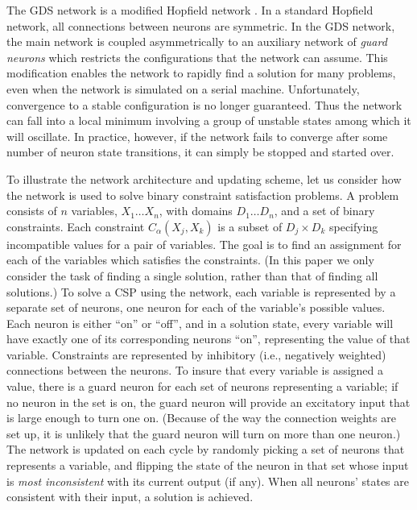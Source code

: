 The GDS network is a modified Hopfield network \cite{hopfield}. 
In a standard Hopfield network, all connections between neurons are
symmetric. In the GDS network, the main network is coupled
asymmetrically to an auxiliary network of {\em guard neurons} which
restricts the configurations that the network can assume.  This
modification enables the network to rapidly find a solution for many
problems, even when the network is simulated on a serial machine.  
Unfortunately, convergence to a stable configuration is no
longer guaranteed.  Thus the network can fall into a local minimum
involving a group of unstable states among which it will oscillate.
In practice, however, if the network fails to converge after some
number of neuron state transitions, it can simply be stopped and
started over.

To illustrate the network architecture and updating scheme, let us
consider how the network is used to solve binary constraint
satisfaction problems.  A problem consists of $n$ variables,
$X_{1}\ldots X_{n}$, with domains $D_{1}\ldots D_{n}$, and a set of
binary constraints. Each constraint $C_{\alpha}(X_{j},X_{k})$ is a
subset of $D_{j} \times D_{k}$ specifying incompatible values for a
pair of variables. The goal is to find an assignment for each of the
variables which satisfies the constraints. (In this paper we only
consider the task of finding a single solution, rather than that of
finding all solutions.)  To solve a CSP using the network, each
variable is represented by a separate set of neurons, one neuron for
each of the variable's possible values.  Each neuron is either ``on''
or ``off'', and in a solution state, every variable will have exactly
one of its corresponding neurons ``on'', representing the value of
that variable.  Constraints are represented by inhibitory (i.e.,
negatively weighted) connections between the neurons.  To insure that
every variable is assigned a value, there is a guard neuron for each
set of neurons representing a variable; if no neuron in the set is on,
the guard neuron will provide an excitatory input that is large enough
to turn one on.  (Because of the way the connection weights are set up, it
is unlikely that the guard neuron will turn on more than one neuron.)
The network is updated on each cycle by randomly picking a set of
neurons that represents a variable, and flipping the state of the
neuron in that set whose input is {\em most inconsistent} with its
current output (if any).  When all neurons' states are consistent with
their input, a solution is achieved.

